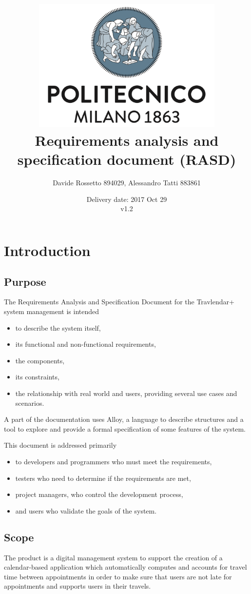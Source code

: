 \documentclass{article}
\title{ 
	\includegraphics[width=95mm]{img/PolimiLogo.png} \\
	\bigskip
	Requirements analysis and specification document (RASD)
}
\author{
	Davide Rossetto 894029, Alessandro Tatti 883861
}
\date{
	Delivery date: 2017 Oct 29\\
	\bigskip v1.2
}
\begin{document}
	
\maketitle
\newpage
\tableofcontents
\newpage
	
	
	\section{Introduction}
	
	
	\subsection{Purpose}
	The Requirements Analysis and Specification Document for the Travlendar+ system management is intended
	\begin{itemize}
		\item to describe the system itself, 
		\item its functional and non-functional requirements, 
		\item the components, 
		\item its constraints,
		\item the relationship with real world and users,  providing several use cases and scenarios.
	\end{itemize}

	\bigskip
	A part of the documentation uses Alloy, a language to describe structures and a tool to explore and provide a formal specification of some features of the system.

	\bigskip
	This document is addressed primarily 
	\begin{itemize}
		\item to developers and programmers who must meet the requirements,
		\item testers who need to determine if the requirements are met,
		\item project managers, who control the development process,
		\item and users who validate the goals of the system.
	\end{itemize}
	
	
	\subsection{Scope}
	The product is a digital management system to support the creation of a calendar-based application which automatically computes and accounts for travel time between appointments in order to make sure that users are not late for appointments and supports users in their travels.
\end{document}
